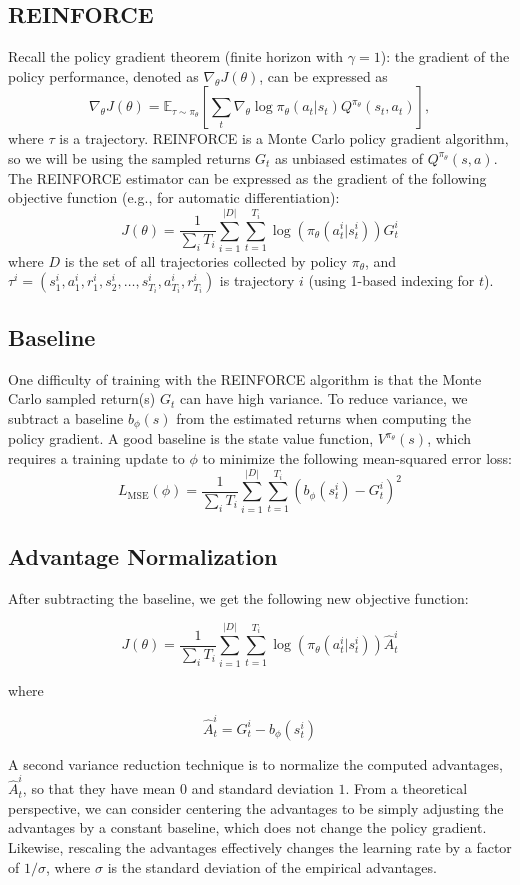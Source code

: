 \documentclass[11pt]{article}
\theoremstyle{case}
\begin{document}
\subsection{REINFORCE}
Recall the policy gradient theorem (finite horizon with $\gamma=1$): the gradient of the policy performance, denoted as $\nabla_\theta J(\theta)$, can be expressed as 
\[ \nabla_\theta J(\theta) = \mathbb E_{\tau \sim \pi_\theta} \left[\sum_t \nabla_\theta \log\pi_\theta(a_t|s_t) Q^{\pi_\theta} (s_t,a_t) \right], \]
where $\tau$ is a trajectory.
REINFORCE is a Monte Carlo policy gradient algorithm, so we will be using the sampled returns $G_t$ as unbiased estimates of $Q^{\pi_\theta}(s,a)$. 
The REINFORCE estimator can be expressed as the gradient of the following objective function (e.g., for automatic differentiation):
\[ J(\theta) = \frac{1}{\sum _i T_i} \sum_{i=1}^{|D|} \sum_{t=1}^{T_i} \log(\pi_\theta(a^i_t|s^i_t)) G^i_t \]
where $D$ is the set of all trajectories collected by policy $\pi_\theta$, and $\tau^i =(s^i_1, a^i_1, r^i_1, s^i_2, \dots, s^i_{T_i}, a^i_{T_i}, r^i_{T_i})$ is trajectory $i$ (using 1-based indexing for $t$).

\subsection{Baseline}
One difficulty of training with the REINFORCE algorithm is that the Monte Carlo sampled return(s) $G_t$ can have high variance. To reduce variance, we subtract a baseline $b_{\phi}(s)$ from the estimated returns when computing the policy gradient. A good baseline is the state value function, $V^{\pi_\theta}(s)$, which requires a training update to $\phi$ to minimize the following mean-squared error loss:
\[ L_{\text{MSE}}(\phi) = \frac{1}{\sum _i T_i} \sum_{i=1}^{|D|} \sum_{t=1}^{T_i} (b_{\phi}(s^i_t) - G^i_t)^2\]

\subsection{Advantage Normalization}

After subtracting the baseline, we get the following new objective function:

\[ J(\theta) = \frac{1}{\sum _i T_i} \sum_{i=1}^{|D|} \sum_{t=1}^{T_i} \log(\pi_\theta(a^i_t|s^i_t)) \hat{A}^i_t \]

where

\[\hat{A}^i_t = G^i_t - b_{\phi}(s^i_t)\]

A second variance reduction technique is to normalize the computed advantages, $\hat{A}^i_t$, so that they have mean $0$ and standard deviation $1$. From a theoretical perspective, we can consider centering the advantages to be simply adjusting the advantages by a constant baseline, which does not change the policy gradient. Likewise, rescaling the advantages effectively changes the learning rate by a factor of $1/\sigma$, where $\sigma$ is the standard deviation of the empirical advantages.
\end{document}
